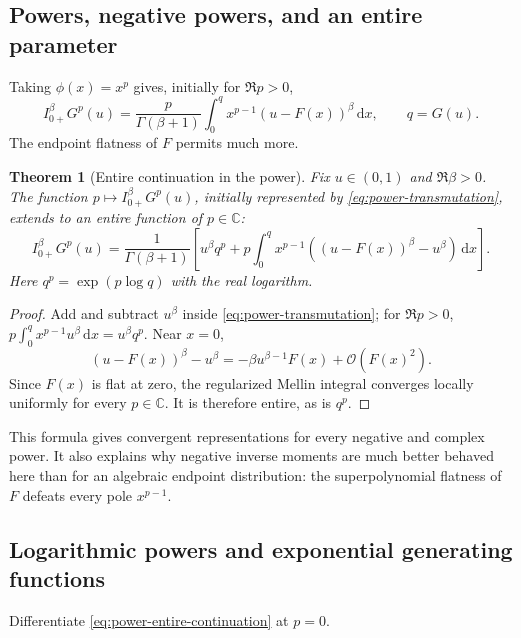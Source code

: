 \documentclass[11pt,oneside]{article}
\newtheorem{theorem}{Theorem}[section]
\theoremstyle{definition}
\theoremstyle{remark}
\newcommand{\C}{\mathbb C}
\newcommand{\dd}{\,\mathrm d}
\newcommand{\bigO}{\mathcal O}
\begin{document}
\subsection{Powers, negative powers, and an entire parameter}

Taking $\phi(x)=x^p$ gives, initially for $\Re p>0$,
\begin{equation}
 I_{0+}^{\beta}G^p(u)
 =\frac{p}{\Gamma(\beta+1)}
  \int_0^{q}x^{p-1}(u-F(x))^\beta\dd x,
 \qquad q=G(u).
 \label{eq:power-transmutation}
\end{equation}
The endpoint flatness of $F$ permits much more.

\begin{theorem}[Entire continuation in the power]
\label{thm:entire-p}
Fix $u\in(0,1)$ and $\Re\beta>0$.  The function
$p\mapsto I_{0+}^{\beta}G^p(u)$, initially represented by
\eqref{eq:power-transmutation}, extends to an entire function of $p\in\C$:
\begin{equation}
 I_{0+}^{\beta}G^p(u)
 =\frac{1}{\Gamma(\beta+1)}\left[
 u^\beta q^p
 +p\int_0^q x^{p-1}
   \left((u-F(x))^\beta-u^\beta\right)\dd x
 \right].
 \label{eq:power-entire-continuation}
\end{equation}
Here $q^p=\exp(p\log q)$ with the real logarithm.
\end{theorem}

\begin{proof}
Add and subtract $u^\beta$ inside \eqref{eq:power-transmutation}; for
$\Re p>0$,
$p\int_0^q x^{p-1}u^\beta\dd x=u^\beta q^p$.  Near $x=0$,
\begin{equation}
 (u-F(x))^\beta-u^\beta
 =-\beta u^{\beta-1}F(x)+\bigO(F(x)^2).
\end{equation}
Since $F(x)$ is flat at zero, the regularized Mellin integral converges
locally uniformly for every $p\in\C$.  It is therefore entire, as is $q^p$.
\end{proof}

This formula gives convergent representations for every negative and complex
power.  It also explains why negative inverse moments are much better
behaved here than for an algebraic endpoint distribution: the superpolynomial
flatness of $F$ defeats every pole $x^{p-1}$.

\subsection{Logarithmic powers and exponential generating functions}

Differentiate \eqref{eq:power-entire-continuation} at $p=0$.
\end{document}
